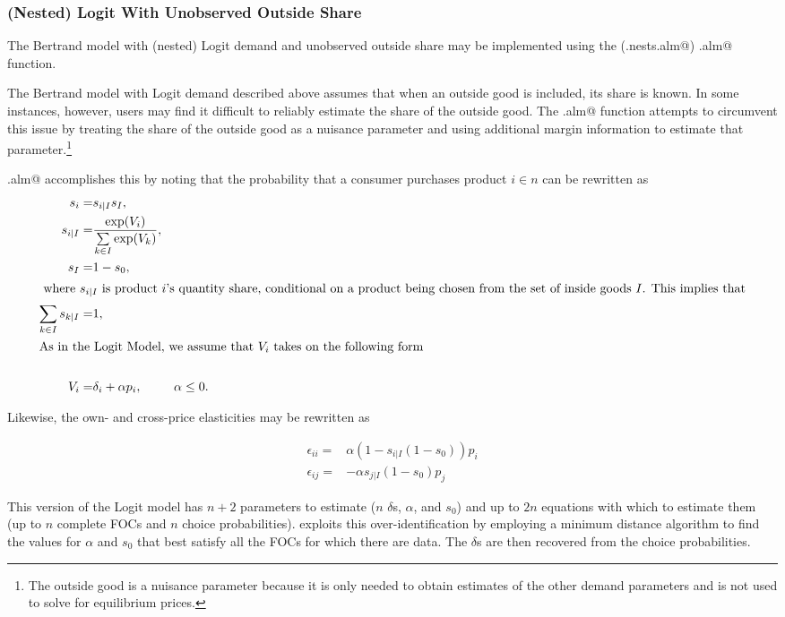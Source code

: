\documentclass[11pt,numbers=noenddot,pointlessnumbers]{scrreprt}
\numberwithin{equation}{section}
\begin{document}
\subsubsection{(Nested) Logit With Unobserved Outside Share}
The Bertrand model with (nested) Logit demand and unobserved outside share may be
implemented using the (\verb@logit.nests.alm@) \verb@logit.alm@ function.

The Bertrand model with Logit demand described above assumes that when
an outside good is included, its share is known. In some instances,
however, users may find it difficult to reliably estimate the share of
the outside good. The \verb@logit.alm@ function attempts to circumvent
this issue by treating the share of the outside good as a nuisance parameter
and using additional margin information to estimate that
parameter.\footnote{The outside good is a nuisance parameter because
  it is only needed to obtain estimates of the other demand
  parameters and is not used to solve for equilibrium prices.}

\verb@logit.alm@ accomplishes this by noting that the probability that a consumer
purchases product $i \in n$ can be rewritten as
\begin{align*}
  s_i=& s_{i|I}s_I,&\\
  s_{i|I}=&\frac{\exp(V_i)}{\sum\limits_{k \in I}\exp(V_k)},&\\
  s_I=&1-s_0,&\\
  \intertext{ where  $s_{i|I}$ is product $i$'s quantity share,
    conditional on a product being chosen from the set of inside goods
    $I$. This implies that}
  \sum\limits_{k \in I} s_{k|I}=&1,&\\
  \intertext{As in the Logit
    Model, we assume that $V_i$ takes on the following form}\\
  V_i=&\delta_i + \alpha p_i,& \alpha\le 0.
\end{align*}

Likewise, the own- and cross-price elasticities may be rewritten as

\begin{align*}
  \epsilon_{ii}=&\alpha (1-s_{i|I}(1-s_0))p_i \\
  \epsilon_{ij}=&-\alpha s_{j|I}(1-s_0)p_j
\end{align*}

This version of the Logit model has $n+2$ parameters to estimate ($n$ $\delta$s,
$\alpha$, and $s_0$) and up to $2n$ equations with which to estimate them (up to
$n$ complete FOCs and $n$
choice probabilities). \verb@calcSlopes@ exploits this over-identification
by employing a minimum distance algorithm to find the
values for $\alpha$ and $s_0$ that best satisfy all the FOCs for which there
 are data. The $\delta$s are then recovered from the choice probabilities.
\end{document}
